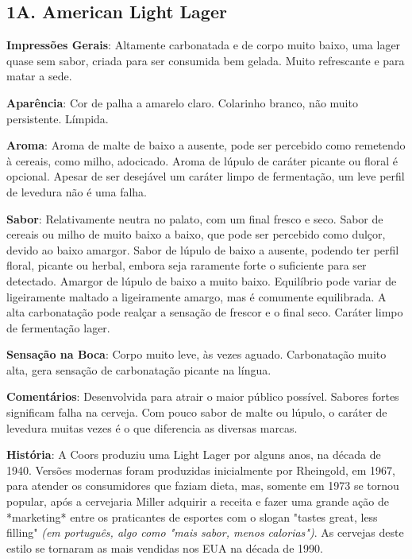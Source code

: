 \subsection*{1A. American Light Lager}

\textbf{Impressões Gerais}: Altamente carbonatada e de corpo muito baixo, uma lager quase sem sabor, criada para ser consumida bem gelada. Muito refrescante e para matar a sede.

\textbf{Aparência}: Cor de palha a amarelo claro. Colarinho branco, não muito persistente. Límpida.

\textbf{Aroma}: Aroma de malte de baixo a ausente, pode ser percebido como remetendo à cereais, como milho, adocicado. Aroma de lúpulo de caráter picante ou floral é opcional. Apesar de ser desejável um caráter limpo de fermentação, um leve perfil de levedura não é uma falha.

\textbf{Sabor}: Relativamente neutra no palato, com um final fresco e seco. Sabor de cereais ou milho de muito baixo a baixo, que pode ser percebido como dulçor, devido ao baixo amargor. Sabor de lúpulo de baixo a ausente, podendo ter perfil floral, picante ou herbal, embora seja raramente forte o suficiente para ser detectado. Amargor de lúpulo de baixo a muito baixo. Equilíbrio pode variar de ligeiramente maltado a ligeiramente amargo, mas é comumente equilibrada. A alta carbonatação pode realçar a sensação de frescor e o final seco. Caráter limpo de fermentação lager.

\textbf{Sensação na Boca}: Corpo muito leve, às vezes aguado. Carbonatação muito alta, gera sensação de carbonatação picante na língua.

\textbf{Comentários}: Desenvolvida para atrair o maior público possível. Sabores fortes significam falha na cerveja. Com pouco sabor de malte ou lúpulo, o caráter de levedura muitas vezes é o que diferencia as diversas marcas.

\textbf{História}: A Coors produziu uma Light Lager por alguns anos, na década de 1940. Versões modernas foram produzidas inicialmente por Rheingold, em 1967, para atender os consumidores que faziam dieta, mas, somente em 1973 se tornou popular, após a cervejaria Miller adquirir a receita e fazer uma grande ação de *marketing* entre os praticantes de esportes com o slogan "tastes great, less filling" \textit{(em português, algo como "mais sabor, menos calorias")}. As cervejas deste estilo se tornaram as mais vendidas nos EUA na década de 1990.

